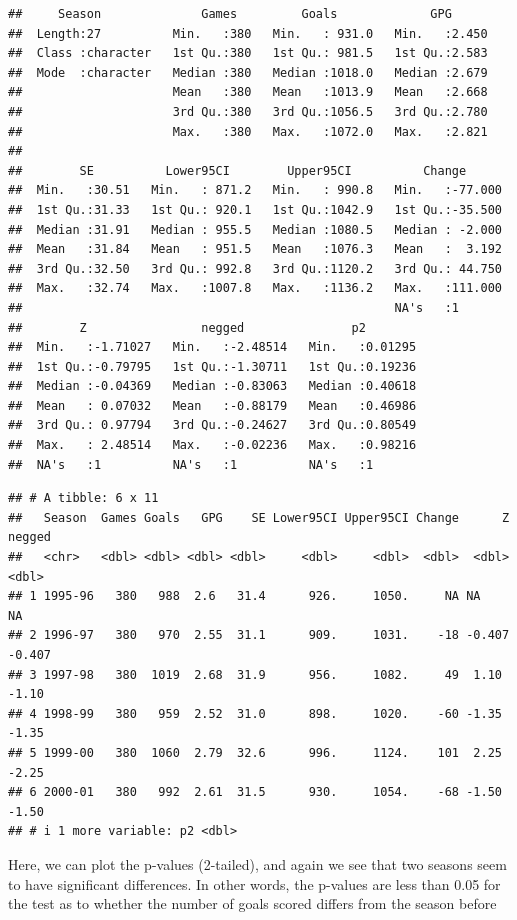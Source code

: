 \documentclass[
]{book}
\begin{document}
\begin{verbatim}
##     Season              Games         Goals             GPG       
##  Length:27          Min.   :380   Min.   : 931.0   Min.   :2.450  
##  Class :character   1st Qu.:380   1st Qu.: 981.5   1st Qu.:2.583  
##  Mode  :character   Median :380   Median :1018.0   Median :2.679  
##                     Mean   :380   Mean   :1013.9   Mean   :2.668  
##                     3rd Qu.:380   3rd Qu.:1056.5   3rd Qu.:2.780  
##                     Max.   :380   Max.   :1072.0   Max.   :2.821  
##                                                                   
##        SE          Lower95CI        Upper95CI          Change       
##  Min.   :30.51   Min.   : 871.2   Min.   : 990.8   Min.   :-77.000  
##  1st Qu.:31.33   1st Qu.: 920.1   1st Qu.:1042.9   1st Qu.:-35.500  
##  Median :31.91   Median : 955.5   Median :1080.5   Median : -2.000  
##  Mean   :31.84   Mean   : 951.5   Mean   :1076.3   Mean   :  3.192  
##  3rd Qu.:32.50   3rd Qu.: 992.8   3rd Qu.:1120.2   3rd Qu.: 44.750  
##  Max.   :32.74   Max.   :1007.8   Max.   :1136.2   Max.   :111.000  
##                                                    NA's   :1        
##        Z                negged               p2         
##  Min.   :-1.71027   Min.   :-2.48514   Min.   :0.01295  
##  1st Qu.:-0.79795   1st Qu.:-1.30711   1st Qu.:0.19236  
##  Median :-0.04369   Median :-0.83063   Median :0.40618  
##  Mean   : 0.07032   Mean   :-0.88179   Mean   :0.46986  
##  3rd Qu.: 0.97794   3rd Qu.:-0.24627   3rd Qu.:0.80549  
##  Max.   : 2.48514   Max.   :-0.02236   Max.   :0.98216  
##  NA's   :1          NA's   :1          NA's   :1
\end{verbatim}

\begin{verbatim}
## # A tibble: 6 x 11
##   Season  Games Goals   GPG    SE Lower95CI Upper95CI Change      Z negged
##   <chr>   <dbl> <dbl> <dbl> <dbl>     <dbl>     <dbl>  <dbl>  <dbl>  <dbl>
## 1 1995-96   380   988  2.6   31.4      926.     1050.     NA NA     NA    
## 2 1996-97   380   970  2.55  31.1      909.     1031.    -18 -0.407 -0.407
## 3 1997-98   380  1019  2.68  31.9      956.     1082.     49  1.10  -1.10 
## 4 1998-99   380   959  2.52  31.0      898.     1020.    -60 -1.35  -1.35 
## 5 1999-00   380  1060  2.79  32.6      996.     1124.    101  2.25  -2.25 
## 6 2000-01   380   992  2.61  31.5      930.     1054.    -68 -1.50  -1.50 
## # i 1 more variable: p2 <dbl>
\end{verbatim}

Here, we can plot the p-values (2-tailed), and again we see that two seasons seem to have significant differences. In other words, the p-values are less than 0.05 for the test as to whether the number of goals scored differs from the season before
\end{document}
